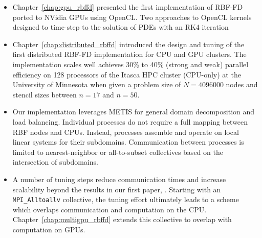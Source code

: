 \begin{itemize}
\item Chapter~\ref{chap:gpu_rbffd} presented the first implementation of RBF-FD ported to NVidia GPUs using OpenCL. Two approaches to OpenCL kernels designed to time-step to the solution of PDEs with an RK4 iteration 

\item Chapter~\ref{chap:distributed_rbffd} introduced the design and tuning of the first distributed RBF-FD implementation for CPU and GPU clusters. The implementation scales well achieves 30\% to 40\% (strong and weak) parallel efficiency on 128 processors of the Itasca HPC cluster (CPU-only) at the University of Minnesota when given a problem size of $N=4096000$ nodes and stencil sizes between $n=17$ and $n=50$. 

\item Our implementation leverages METIS for general domain decomposition and load balancing. Individual processes do not require a full mapping between RBF nodes and CPUs. Instead, processes assemble and operate on local linear systems for their subdomains. Communication between processes is limited to nearest-neighbor or all-to-subset collectives based on the intersection of subdomains. 


\item A number of tuning steps reduce communication times and increase scalability beyond the results in our first paper, \cite{BolligFlyerErlebacher2012}. Starting with an \texttt{MPI\_Alltoallv} collective, the tuning effort ultimately leads to a scheme which overlaps communication and computation on the CPU. Chapter~\ref{chap:multigpu_rbffd} extends this collective to overlap with computation on GPUs. 
\end{itemize} 


